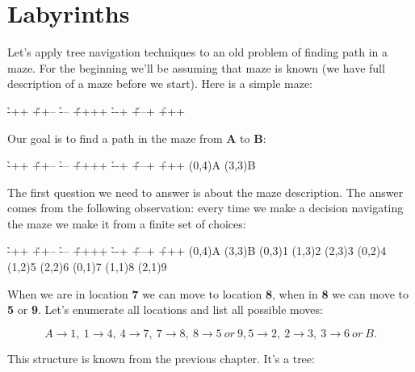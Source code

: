 \chapter{Labyrinths}

Let's apply tree navigation techniques to an old problem
of finding path in a maze. For the beginning we'll be assuming that
maze is known (we have full description of a maze before we start).
Here is a simple maze:

\begin{labyrinth}{3}{4}
        \h -++
\v ++-- \h ---
\v ++++ \h --+
\v +--+ \h +++
\end{labyrinth}

Our goal is to find a path in the maze from \textbf{A} to \textbf{B}:

\begin{labyrinth}{3}{4}
        \h -++
\v ++-- \h ---
\v ++++ \h --+
\v +--+ \h +++
\putsymbol(0,4){\small{A}}
\putsymbol(3,3){\small{B}}
\end{labyrinth}

The first question we need to answer is about the maze description.
The answer comes from the following observation: every time we
make a decision navigating the maze we make it from a finite set
of choices:

\begin{labyrinth}{3}{4}
        \h -++
\v ++-- \h ---
\v ++++ \h --+
\v +--+ \h +++
\putsymbol(0,4){\small{A}}
\putsymbol(3,3){\small{B}}
\putsymbol(0,3){\small{1}}
\putsymbol(1,3){\small{2}}
\putsymbol(2,3){\small{3}}
\putsymbol(0,2){\small{4}}
\putsymbol(1,2){\small{5}}
\putsymbol(2,2){\small{6}}
\putsymbol(0,1){\small{7}}
\putsymbol(1,1){\small{8}}
\putsymbol(2,1){\small{9}}
\end{labyrinth}


When we are in location \textbf{7} we can move to location 
\textbf{8}, when in \textbf{8} we can move to \textbf{5} or \textbf{9}.
Let's enumerate all locations and list all possible moves:

$$A\rightarrow 1,\ 1\rightarrow 4,\ 
4\rightarrow 7,\ 7\rightarrow 8,\ 8\rightarrow 5\ or\ 9,
5\rightarrow 2,\ 2\rightarrow 3,\ 3\rightarrow 6\ or\ B.$$

This structure is known from the previous chapter. It's a tree:


